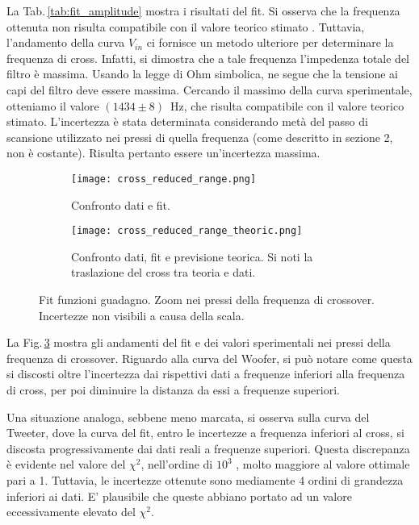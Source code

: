 \documentclass[../Relazione_circuiti]{subfiles}
\begin{document}
  

  La Tab.\,\ref{tab:fit_amplitude} mostra i risultati del fit.
  Si osserva che la frequenza ottenuta non risulta compatibile con il valore teorico stimato \theoryF.
  Tuttavia, l'andamento della curva $V_{in}$ ci fornisce un metodo ulteriore per determinare la frequenza di cross.
  Infatti, si dimostra che a tale frequenza l'impedenza totale del filtro è massima.
  Usando la legge di Ohm simbolica, ne segue che la tensione ai capi del filtro deve essere massima.
  Cercando il massimo della curva sperimentale, otteniamo il valore $(1434 \pm 8)$~Hz, che risulta compatibile con il
  valore teorico stimato.
  L'incertezza è stata determinata considerando metà del passo di scansione utilizzato nei pressi di quella frequenza
  (come descritto in sezione 2, non è costante).
  Risulta pertanto essere un'incertezza massima.

  \begin{figure}[H]
    \centering

    \begin{subfigure}[t]{=0.49\textwidth}
      \texttt{[image: cross\_reduced\_range.png]}
      \caption{Confronto dati e fit.}
      \label{fig: amp_gain_fit_data_reduced}

    \end{subfigure}
    \hfill
    \begin{subfigure}[t]{=0.49\textwidth}
      \texttt{[image: cross\_reduced\_range\_theoric.png]}
      \caption{Confronto dati, fit e previsione teorica. Si noti la traslazione del cross tra teoria e dati.}
      \label{fig: amp_gain_fit_theoric_reduced}
    \end{subfigure}

    \caption
    {Fit funzioni guadagno. Zoom nei pressi della frequenza di crossover. Incertezze non visibili a causa della scala.}
    \label{fig: amp_gain_fit_reduced}


  \end{figure}

  La Fig.\,\ref{fig: amp_gain_fit_reduced}
  mostra gli andamenti del fit e dei valori sperimentali nei pressi della frequenza di crossover.
  Riguardo alla curva del Woofer, si può notare come questa si discosti oltre l'incertezza dai rispettivi dati a
  frequenze inferiori alla frequenza di cross, per poi diminuire la distanza da essi a frequenze superiori.

  Una situazione analoga, sebbene meno marcata, si osserva sulla curva del Tweeter, dove la curva del fit, entro le
  incertezze a frequenza inferiori al cross, si discosta progressivamente dai dati reali a frequenze superiori.
  Questa discrepanza è evidente nel valore del $\chi^2$, nell'ordine di $10^3$
  , molto maggiore al valore ottimale pari a 1.
  Tuttavia, le incertezze ottenute sono mediamente 4 ordini di grandezza inferiori ai dati. E' plausibile che queste
  abbiano portato ad un valore eccessivamente elevato del $\chi^2$.
\end{document}
